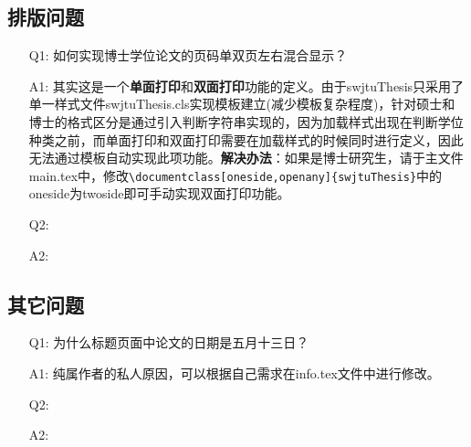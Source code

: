 \subsection{排版问题}
\begin{enumerate}
	\item[Q1:]如何实现博士学位论文的页码单双页左右混合显示？
	\item[A1:]其实这是一个\textbf{单面打印}和\textbf{双面打印}功能的定义。由于swjtuThesis只采用了单一样式文件swjtuThesis.cls实现模板建立(减少模板复杂程度)，针对硕士和博士的格式区分是通过引入判断字符串实现的，因为加载样式出现在判断学位种类之前，而单面打印和双面打印需要在加载样式的时候同时进行定义，因此无法通过模板自动实现此项功能。\textbf{解决办法}：如果是博士研究生，请于主文件main.tex中，修改\verb|\documentclass[oneside,openany]{swjtuThesis}|中的oneside为twoside即可手动实现双面打印功能。	
	\item[Q2:]
	\item[A2:]
\end{enumerate}

\subsection{其它问题}
\begin{enumerate}
	\item[Q1:]为什么标题页面中论文的日期是五月十三日？
	\item[A1:]纯属作者的私人原因，可以根据自己需求在info.tex文件中进行修改。
	\item[Q2:]
	\item[A2:]
\end{enumerate}

